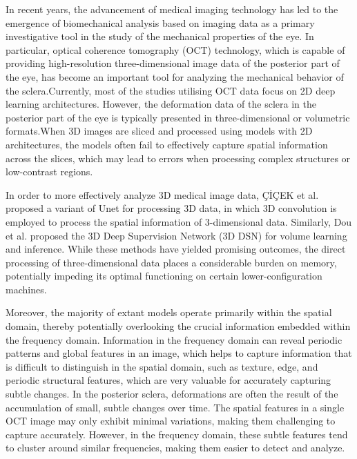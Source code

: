 \documentclass[AMA,Times1COL]{WileyNJDv5} %
\begin{document}
In recent years, the advancement of medical imaging technology has led to the emergence of biomechanical analysis based on imaging data as a primary investigative tool in the study of the mechanical properties of the eye\cite{li2022simultaneous, koprowski2017new}. In particular, optical coherence tomography (OCT) technology, which is capable of providing high-resolution three-dimensional image data of the posterior part of the eye, has become an important tool for analyzing the mechanical behavior of the sclera.Currently, most of the studies utilising OCT data focus on 2D deep learning architectures\cite{kugelman2019automatic, read2019choroidal}. However, the deformation data of the sclera in the posterior part of the eye is typically presented in three-dimensional or volumetric formats.When 3D images are sliced and processed using models with 2D architectures, the models often fail to effectively capture spatial information across the slices, which may lead to errors when processing complex structures or low-contrast regions.

In order to more effectively analyze 3D medical image data, ÇİÇEK et al.\cite{cciccek20163d} proposed a variant of Unet for processing 3D data, in which 3D convolution is employed to process the spatial information of 3-dimensional data. Similarly, Dou et al.\cite{dou20163d} proposed the 3D Deep Supervision Network (3D DSN) for volume learning and inference. While these methods have yielded promising outcomes, the direct processing of three-dimensional data places a considerable burden on memory, potentially impeding its optimal functioning on certain lower-configuration machines.

Moreover, the majority of extant models operate primarily within the spatial domain, thereby potentially overlooking the crucial information embedded within the frequency domain. Information in the frequency domain can reveal periodic patterns and global features in an image, which helps to capture information that is difficult to distinguish in the spatial domain\cite{huang2023fvfsnet,hai2022combining}, such as texture, edge, and periodic structural features, which are very valuable for accurately capturing subtle changes. In the posterior sclera, deformations are often the result of the accumulation of small, subtle changes over time. The spatial features in a single OCT image may only exhibit minimal variations, making them challenging to capture accurately. However, in the frequency domain, these subtle features tend to cluster around similar frequencies, making them easier to detect and analyze.
\end{document}
